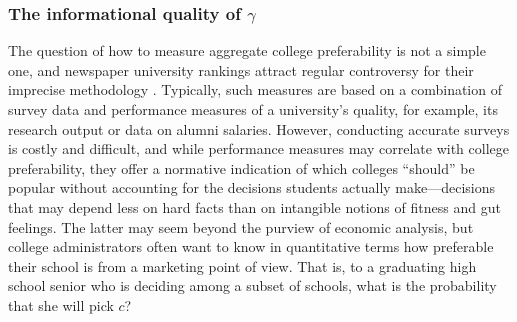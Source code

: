 \documentclass[12pt]{article}
\theoremstyle{definition}
\begin{document}
\subsubsection{The informational quality of $\gamma$}
The question of how to measure aggregate college preferability is not a simple one, and newspaper university rankings attract regular controversy for their imprecise methodology \parencite[][]{intlrankingsandconflicts}. Typically, such measures are based on a combination of survey data and performance measures of a university's quality, for example, its research output or data on alumni salaries. However, conducting accurate surveys is costly and difficult, and while performance measures may correlate with college preferability, they offer a normative indication of which colleges ``should'' be popular without accounting for the decisions students actually make---decisions that may depend less on hard facts than on intangible notions of fitness and gut feelings. The latter may seem beyond the purview of economic analysis, but college administrators often want to know in quantitative terms how preferable their school is from a marketing point of view. That is, to a graduating high school senior who is deciding among a subset of schools, what is the probability that she will pick $c$?
\end{document}
